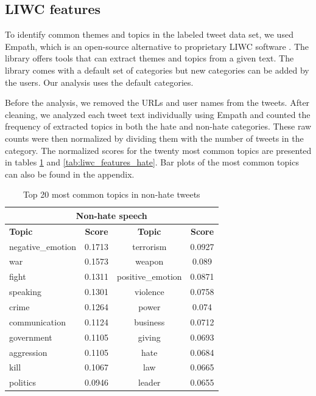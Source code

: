 \documentclass[conference]{IEEEtran}
\begin{document}

\subsection{LIWC features}
To identify common themes and topics in the labeled tweet data set, we 
used Empath, which is an open-source alternative to proprietary LIWC software  \cite{fast2016empath}. 
The library offers tools that can extract themes and topics from a given text.
The library comes with a default set of categories but new categories can be added by the users. 
Our analysis uses the default categories.

Before the analysis, we removed the URLs and user names from the tweets. After cleaning, we analyzed each tweet text individually using Empath and counted the frequency of extracted topics in both the hate and non-hate categories. 
These raw counts were then normalized by dividing them with the number of tweets in the category. The normalized 
scores for the twenty most common topics are presented in tables \ref{tab:liwc_features_non_hate} 
and \ref{tab:liwc_features_hate}. Bar plots of the most common topics can also be found in the appendix.

\begin{table}[!ht]
    \def\arraystretch{1.2}%
    \begin{center}
      \caption{Top 20 most common topics in non-hate tweets}
      \label{tab:liwc_features_non_hate}
      \begin{tabular}{l c | c c}
        \hline\hline
        \multicolumn{4}{c}{\textbf{Non-hate speech}}\\
        \hline
        \textbf{Topic}&\textbf{Score}&\textbf{Topic}&\textbf{Score}\\
        \hline
        negative\_emotion&0.1713&terrorism&0.0927\\
        war&0.1573&weapon&0.089\\
        fight&0.1311&positive\_emotion&0.0871\\
        speaking&0.1301&violence&0.0758\\
        crime&0.1264&power&0.074\\
        communication&0.1124&business&0.0712\\
        government&0.1105&giving&0.0693\\
        aggression&0.1105&hate&0.0684\\
        kill&0.1067&law&0.0665\\
        politics&0.0946&leader&0.0655\\
        \hline\hline
      \end{tabular}  
    \end{center}
  \end{table}
\end{document}
